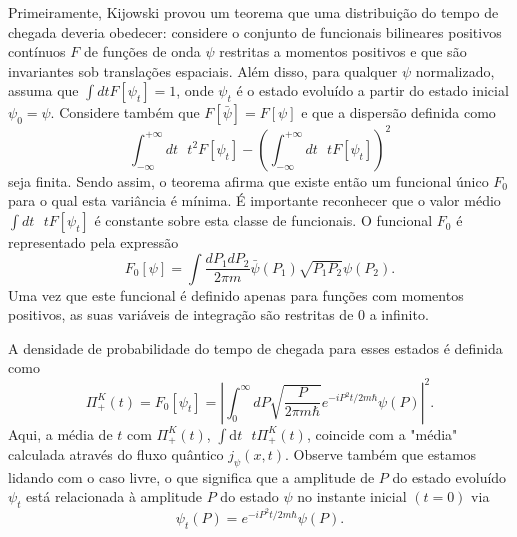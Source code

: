 Primeiramente, Kijowski provou um teorema que uma distribuição do tempo de chegada deveria obedecer: considere o conjunto de funcionais bilineares positivos contínuos $F$ de funções de onda $\psi$ restritas a momentos positivos e que são invariantes sob translações espaciais. Além disso, para qualquer $\psi$ normalizado, assuma que $\int dt F[\psi_t] = 1$, onde $\psi_t$ é o estado evoluído a partir do estado inicial $\psi_0 = \psi$. Considere também que $F[\bar{\psi}] = F[\psi]$ e que a dispersão definida como
\begin{equation}
	\int_{-\infty}^{+\infty} d t \text{ } t^2 F\left[\psi_t\right]-\left(\int_{-\infty}^{+\infty} d t \text{ } t F\left[\psi_t\right]\right)^2
\end{equation}
seja finita. Sendo assim, o teorema afirma que existe então um funcional único $F_0$ para o qual esta variância é mínima. É importante reconhecer que o valor médio $\int d t \text{ } t F[\psi_t]$ é constante sobre esta classe de funcionais. O funcional $F_0$ é representado pela expressão
\begin{equation}
	F_0[\psi] = \int \frac{d P_1 dP_2}{2\pi m} \bar{\psi}(P_1)\sqrt{P_1 P_2}\psi(P_2).
\end{equation}
 Uma vez que este funcional é definido apenas para funções com momentos positivos, as suas variáveis de integração são restritas de $0$ a infinito. 
 
 
 A densidade de probabilidade do tempo de chegada para esses estados é definida como
\begin{equation}
	\Pi_{+}^K(t) = F_0\left[\psi_t\right]=\left|\int_0^{\infty} d P \sqrt{\frac{P}{2 \pi m \hbar}} e^{-i P^2 t / 2 m \hbar} \psi(P)\right|^2 .
\end{equation}
Aqui, a média de $t$ com $\Pi_{+}^K(t)$, $\int \text{d} t \text{ } t \Pi_{+}^K(t)$, coincide com a "média" \text{ }calculada através do fluxo quântico $j_{\psi}(x,t)$. Observe também que estamos lidando com o caso livre, o que significa que a amplitude de $P$ do estado evoluído $\psi_t$ está relacionada à amplitude $P$ do estado $\psi$ no instante inicial $(t = 0)$ via
\begin{equation}
	\psi_t(P)=e^{-i P^2 t / 2 m \hbar} \psi(P).
\end{equation}


